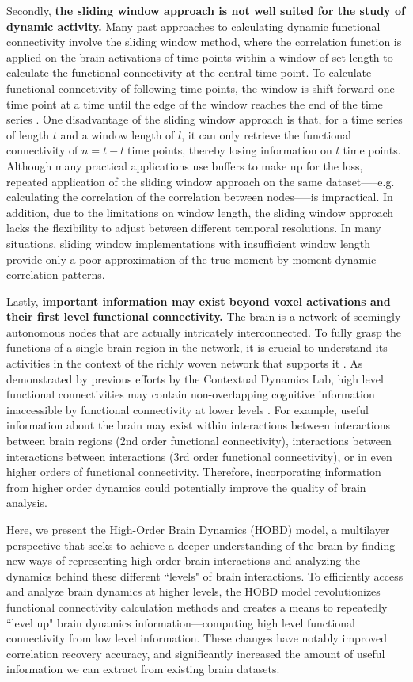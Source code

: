 \documentclass[11pt]{article}
\begin{document}
Secondly, \textbf{the sliding window approach is not well suited for the study of dynamic activity.} Many past approaches to calculating dynamic functional connectivity involve the sliding window method, where the correlation function is applied on the brain activations of time points within a window of set length to calculate the functional connectivity at the central time point. To calculate functional connectivity of following time points, the window is shift forward one time point at a time until the edge of the window reaches the end of the time series \citep{enrico2011}\citep{elena2012}. One disadvantage of the sliding window approach is that, for a time series of length $t$ and a window length of $l$, it can only retrieve the functional connectivity of $n=t-l$ time points, thereby losing information on $l$ time points. Although many practical applications use buffers to make up for the loss, repeated application of the sliding window approach on the same dataset—--e.g. calculating the correlation of the correlation between nodes—--is impractical. In addition, due to the limitations on window length, the sliding window approach lacks the flexibility to adjust between different temporal resolutions. In many situations, sliding window implementations with insufficient window length provide only a poor approximation of the true moment-by-moment dynamic correlation patterns.

Lastly, \textbf{important information may exist beyond voxel activations and their first level functional connectivity.} The brain is a network of seemingly autonomous nodes that are actually intricately interconnected. To fully grasp the functions of a single brain region in the network, it is crucial to understand its activities in the context of the richly woven network that supports it \citep{Battiston2017}. As demonstrated by previous efforts by the Contextual Dynamics Lab, high level functional connectivities may contain non-overlapping cognitive information inaccessible by functional connectivity at lower levels \citep{jeremy2017}. For example, useful information about the brain may exist within interactions between interactions between brain regions (2nd order functional connectivity), interactions between interactions between interactions (3rd order functional connectivity), or in even higher orders of functional connectivity. Therefore, incorporating information from higher order dynamics could potentially improve the quality of brain analysis.

Here, we present the High-Order Brain Dynamics (HOBD) model, a multilayer perspective that seeks to achieve a deeper understanding of the brain by finding new ways of representing high-order brain interactions and analyzing the dynamics behind these different ``levels" of brain interactions. To efficiently access and analyze brain dynamics at higher levels, the HOBD model revolutionizes functional connectivity calculation methods and creates a means to repeatedly ``level up" brain dynamics information---computing high level functional connectivity from low level information. These changes have notably improved correlation recovery accuracy, and significantly increased the amount of useful information we can extract from existing brain datasets.
\end{document}
